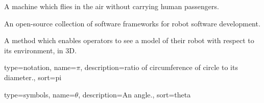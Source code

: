 
 {
  A machine which flies in the air without carrying human passengers.
}

 {
  An open-source collection of software frameworks for robot software development.
}

 {
  A method which enables operators to see a model of their robot with respect to its environment, in 3D.
}


 {
  type=notation,
  name={\ensuremath{\pi}},
  description={ratio of circumference of circle to its diameter.},
  sort=pi
}

 {
  type=symbols,
  name={\ensuremath{\theta}},
  description={An angle.},
  sort=theta
}
